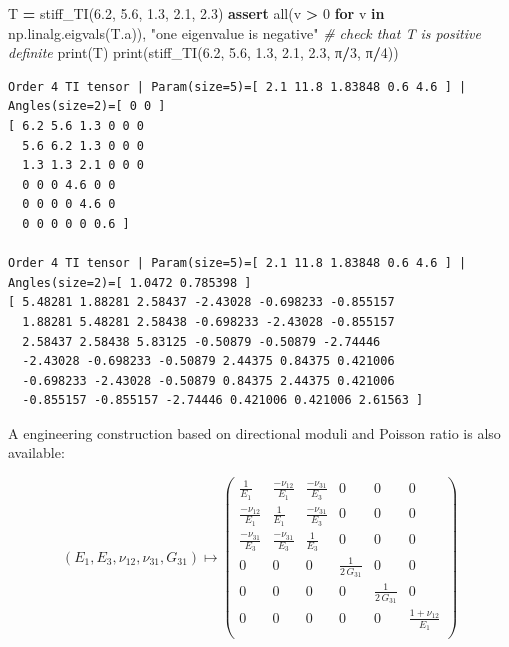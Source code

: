 \documentclass[
  a4paper,
  numbers=noendperiod,
  DIV=12]{scrreprt}
\newenvironment{Shaded}{\begin{snugshade}}{\end{snugshade}}
\newcommand{\BuiltInTok}[1]{#1}
\newcommand{\CommentTok}[1]{\textcolor[rgb]{0.56,0.35,0.01}{\textit{#1}}}
\newcommand{\ControlFlowTok}[1]{\textcolor[rgb]{0.13,0.29,0.53}{\textbf{#1}}}
\newcommand{\DecValTok}[1]{\textcolor[rgb]{0.00,0.00,0.81}{#1}}
\newcommand{\FloatTok}[1]{\textcolor[rgb]{0.00,0.00,0.81}{#1}}
\newcommand{\KeywordTok}[1]{\textcolor[rgb]{0.13,0.29,0.53}{\textbf{#1}}}
\newcommand{\NormalTok}[1]{#1}
\newcommand{\OperatorTok}[1]{\textcolor[rgb]{0.81,0.36,0.00}{\textbf{#1}}}
\newcommand{\StringTok}[1]{\textcolor[rgb]{0.31,0.60,0.02}{#1}}
\begin{document}
\begin{Shaded}
\begin{Highlighting}[]
\NormalTok{T }\OperatorTok{=}\NormalTok{ stiff\_TI(}\FloatTok{6.2}\NormalTok{, }\FloatTok{5.6}\NormalTok{, }\FloatTok{1.3}\NormalTok{, }\FloatTok{2.1}\NormalTok{, }\FloatTok{2.3}\NormalTok{)}
\ControlFlowTok{assert} \BuiltInTok{all}\NormalTok{(v }\OperatorTok{\textgreater{}} \DecValTok{0} \ControlFlowTok{for}\NormalTok{ v }\KeywordTok{in}\NormalTok{ np.linalg.eigvals(T.a)), }\StringTok{"one eigenvalue is negative"}
\CommentTok{\# check that T is positive definite}
\BuiltInTok{print}\NormalTok{(T)}
\BuiltInTok{print}\NormalTok{(stiff\_TI(}\FloatTok{6.2}\NormalTok{, }\FloatTok{5.6}\NormalTok{, }\FloatTok{1.3}\NormalTok{, }\FloatTok{2.1}\NormalTok{, }\FloatTok{2.3}\NormalTok{, π}\OperatorTok{/}\DecValTok{3}\NormalTok{, π}\OperatorTok{/}\DecValTok{4}\NormalTok{))}
\end{Highlighting}
\end{Shaded}

\begin{verbatim}
Order 4 TI tensor | Param(size=5)=[ 2.1 11.8 1.83848 0.6 4.6 ] | Angles(size=2)=[ 0 0 ]
[ 6.2 5.6 1.3 0 0 0 
  5.6 6.2 1.3 0 0 0 
  1.3 1.3 2.1 0 0 0 
  0 0 0 4.6 0 0 
  0 0 0 0 4.6 0 
  0 0 0 0 0 0.6 ]

Order 4 TI tensor | Param(size=5)=[ 2.1 11.8 1.83848 0.6 4.6 ] | Angles(size=2)=[ 1.0472 0.785398 ]
[ 5.48281 1.88281 2.58437 -2.43028 -0.698233 -0.855157 
  1.88281 5.48281 2.58438 -0.698233 -2.43028 -0.855157 
  2.58437 2.58438 5.83125 -0.50879 -0.50879 -2.74446 
  -2.43028 -0.698233 -0.50879 2.44375 0.84375 0.421006 
  -0.698233 -2.43028 -0.50879 0.84375 2.44375 0.421006 
  -0.855157 -0.855157 -2.74446 0.421006 0.421006 2.61563 ]
\end{verbatim}

A engineering construction based on directional moduli and Poisson ratio
is also available:

\[
(E_1, E_3, \nu_{1 2}, \nu_{3 1}, G_{3 1})
\mapsto
\left(
\begin{array}{cccccc}
\frac{1}{E_1} & \frac{ - \nu_{1 2}}{E_1} & \frac{ - \nu_{3 1}}{E_3} & 0 & 0 & 0 \\
\frac{ - \nu_{1 2}}{E_1} & \frac{1}{E_1} & \frac{ - \nu_{3 1}}{E_3} & 0 & 0 & 0 \\
\frac{ - \nu_{3 1}}{E_3} & \frac{ - \nu_{3 1}}{E_3} & \frac{1}{E_3} & 0 & 0 & 0 \\
0 & 0 & 0 & \frac{1}{2 \, G_{3 1}} & 0 & 0 \\
0 & 0 & 0 & 0 & \frac{1}{2 \, G_{3 1}} & 0 \\
0 & 0 & 0 & 0 & 0 & \frac{1 + \nu_{1 2}}{E_1} \\
\end{array}
\right)
\]
\end{document}
